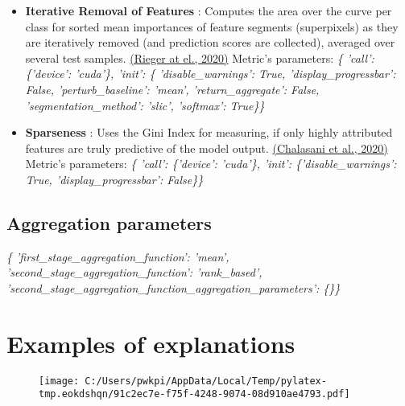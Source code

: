 \documentclass{article}%
\begin{document}
\begin{itemize}
{}%
\item%
\textbf{Iterative Removal of Features}%
: Computes the area over the curve per class for sorted mean importances of feature segments (superpixels) as they are iteratively removed (and prediction scores are collected), averaged over several test samples.%
\href{https://arxiv.org/abs/2003.08747}{(Rieger at el., 2020)}%
\newline%
%
Metric's parameters: \newline%
%
\textit{\{   'call': \{'device': 'cuda'\},\newline%
    'init': \{   'disable\_warnings': True,\newline%
                'display\_progressbar': False,\newline%
                'perturb\_baseline': 'mean',\newline%
                'return\_aggregate': False,\newline%
                'segmentation\_method': 'slic',\newline%
                'softmax': True\}\} \newline%
}%
\item%
\textbf{Sparseness}%
: Uses the Gini Index for measuring, if only highly attributed features are truly predictive of the model output.%
\href{https://arxiv.org/abs/1810.06583}{(Chalasani et al., 2020)}%
\newline%
%
Metric's parameters: \newline%
%
\textit{\{   'call': \{'device': 'cuda'\},\newline%
    'init': \{'disable\_warnings': True, 'display\_progressbar': False\}\} \newline%
}%
\end{itemize}

%
\subsection*{Aggregation parameters}%
\label{subsec:Aggregationparameters}%
\textit{\{   'first\_stage\_aggregation\_function': 'mean',\newline%
    'second\_stage\_aggregation\_function': 'rank\_based',\newline%
    'second\_stage\_aggregation\_function\_aggregation\_parameters': \{\}\}}

%
\newpage%
\section*{Examples of explanations}%
\label{sec:Examplesofexplanations}%


\begin{figure}[!h]%
\centering%
\texttt{[image: C:/Users/pwkpi/AppData/Local/Temp/pylatex-tmp.eokdshqn/91c2ec7e-f75f-4248-9074-08d910ae4793.pdf]}%
\end{figure}

%
\end{document}
